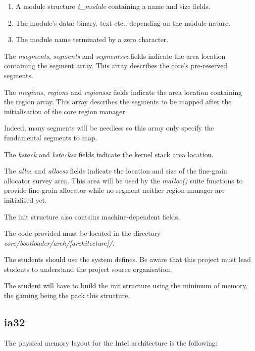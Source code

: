 \begin{enumerate}
  \item
    A module structure \textit{t\_module} containing a name and size fields.
  \item
    The module's data: binary, text etc.. depending on the module nature.
  \item
    The module name terminated by a zero character.
\end{enumerate}

The \textit{nsegments}, \textit{segments} and \textit{segmentssz} fields
indicate the area location containing the segment array. This array
describes the core's pre-reserved segments.

The \textit{nregions}, \textit{regions} and \textit{regionssz} fields
indicate the area location containing the region array. This array
describes the segments to be mapped after the initialisation of the
core region manager.

Indeed, many segments will be needless so this array only specify the
fundamental segments to map.

The \textit{kstack} and \textit{kstacksz} fields indicate the kernel
stack area location.

The \textit{alloc} and \textit{allocsz} fields indicate the location
and size of the fine-grain allocator survey area. This area will be
used by the \textit{malloc()} suite functions to provide fine-grain
allocator while no segment neither region manager are initialised yet.

The init structure also contains machine-dependent fields.

The code provided must be located in the directory
\textit{core/bootloader/arch/[architecture]/}.

The students should use the system defines. Be aware that this project
must lead students to understand the project source organisation.

The student will have to build the init structure using the minimum
of memory, the gaming being the pack this structure.

%
%

\subsection{ia32}

The physical memory layout for the Intel architecture is the following:

